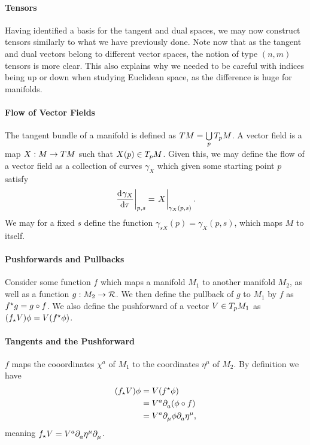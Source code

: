 \paragraph{Tensors}
Having identified a basis for the tangent and dual spaces, we may now construct tensors similarly to what we have previously done. Note now that as the tangent and dual vectors belong to different vector spaces, the notion of type $(n, m)$ tensors is more clear. This also explains why we needed to be careful with indices being up or down when studying Euclidean space, as the difference is huge for manifolds.

\paragraph{Flow of Vector Fields}
The tangent bundle of a manifold is defined as $TM = \bigcup\limits_{p}T_{p}M$. A vector field is a map $X: M\to TM$ such that $X(p)\in T_{p}M$. Given this, we may define the flow of a vector field as a collection of curves $\gamma_{X}$ which given some starting point $p$ satisfy
\begin{align*}
	\deval{\gamma_{X}}{\tau}{p, s} = \eval{X}_{\gamma_{X}(p, s)}.
\end{align*}
We may for a fixed $s$ define the function $\gamma_{sX}(p) = \gamma_{X}(p, s)$, which maps $M$ to itself.

\paragraph{Pushforwards and Pullbacks}
Consider some function $f$ which maps a manifold $M_{1}$ to another manifold $M_{2}$, as well as a function $g: M_{2}\to\mathcal{R}$. We then define the pullback of $g$ to $M_{1}$ by $f$ as $f^{\star}g = g\circ f$. We also define the pushforward of a vector $V\in T_{p}M_{1}$ as $(f_{\star}V)\phi = V(f^{\star}\phi)$.

\paragraph{Tangents and the Pushforward}
$f$ maps the cooordinates $\chi^{a}$ of $M_{1}$ to the coordinates $\eta^{\mu}$ of $M_{2}$. By definition we have
\begin{align*}
	(f_{\star}V)\phi &= V(f^{\star}\phi) \\
	&= V^{a}\partial^{}_{a}(\phi\circ f) \\
	&= V^{a}\partial^{}_{\mu}\phi\partial^{}_{a}\eta^{\mu},
\end{align*}
meaning $f_{\star}V = V^{a}\partial^{}_{a}\eta^{\mu}\partial^{}_{\mu}$.

